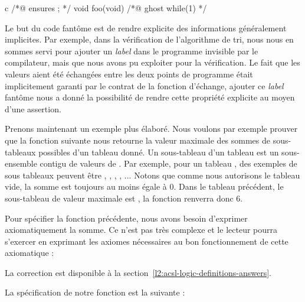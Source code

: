 \begin{CodeBlock}{c}
/*@ ensures \false ; */
void foo(void){
  /*@ ghost
    while(1){}
  */
}
\end{CodeBlock}




Le but du code fantôme est de rendre explicite des informations généralement
implicites. Par exemple, dans la vérification de l'algorithme de tri, nous nous en
sommes servi pour ajouter un \textit{label} dans le programme
invisible par le compilateur, mais que nous avons pu exploiter pour la vérification.
Le fait que les valeurs aient été échangées entre les deux points de programme était
implicitement garanti par le contrat de la fonction d'échange, ajouter ce
\textit{label} fantôme nous a donné la possibilité de rendre cette propriété
explicite au moyen d'une assertion.



Prenons maintenant un exemple plus élaboré. Nous voulons par exemple prouver que
la fonction suivante nous retourne la valeur maximale des sommes de sous-tableaux
possibles d'un tableau donné. Un sous-tableau d'un tableau  est un
sous-ensemble contigu de valeurs de . Par exemple, pour un tableau
, des exemples de sous tableaux peuvent être
\CodeInline{\{\}}, , ,
, ... Notons que comme nous autorisons le
tableau vide, la somme est toujours au moins égale à 0. Dans le tableau précédent,
le sous-tableau de valeur maximale est , la fonction
renverra donc 6.






Pour spécifier la fonction précédente, nous avons besoin d'exprimer
axiomatiquement la somme. Ce n'est pas très complexe et le lecteur pourra
s'exercer en exprimant les axiomes nécessaires au bon fonctionnement de cette
axiomatique :





La correction est disponible à la section~\ref{l2:acsl-logic-definitions-answers}.


La spécification de notre fonction est la suivante :



